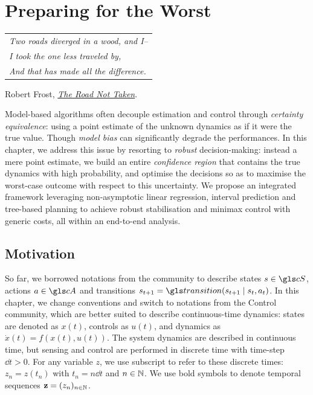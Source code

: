 
\graphicspath{{2-Chapters/7-Chapter/}}

\chapter{Preparing for the Worst}
\label{chapter:7}

\begin{flushright}
	\begin{tabular}{@{}l@{}}
		\emph{Two roads diverged in a wood, and I--}\\
		\emph{I took the one less traveled by,}\\
		\emph{And that has made all the difference.}\\
	\end{tabular}
	
	Robert Frost, \href{https://eleurent.github.io/sisyphe/texts/the-road-not-taken.html}{\emph{The Road Not Taken}}.
\end{flushright}

\abstractStartChapter{}%
Model-based algorithms often decouple estimation and control through \emph{certainty equivalence}: using a point estimate of the unknown dynamics as if it were the true value. Though \textit{model bias} can significantly degrade the performances. In this chapter, we address this issue by resorting to \emph{robust} decision-making: instead a mere point estimate, we build an entire \emph{confidence region} that contains the true dynamics with high probability, and optimise the decisions so as to maximise the worst-case outcome with respect to this uncertainty. We propose an integrated framework leveraging non-asymptotic linear regression, interval prediction and tree-based planning to achieve robust stabilisation and minimax control with generic costs, all within an end-to-end analysis.
\minitocStartChapter{}

\section{Motivation}

\begin{remark}
\begin{leftbar}[remarkbar]
So far, we borrowed notations from the  community to describe states $s\in \cS$, actions $a\in\cA$ and transitions $s_{t+1} = \Ps\parentheses{s_{t+1}\mid s_t,a_t}$. In this chapter, we change conventions and switch to notations from the Control community, which are better suited to describe continuous-time dynamics: states are denoted as $x(t)$, controls as $u(t)$, and dynamics as $\dot{x}(t) = f(x(t), u(t))$. 
The system dynamics are described in continuous time, but sensing and control are performed in discrete time with time-step $\dd t>0$. For any variable $z$, we use subscript to refer to these discrete times: $z_n = z(t_n)$ with $t_n = n\dd t$ and $n\in\mathbb{N}$. We use bold symbols to denote temporal sequences $\mathbf{z} = (z_n)_{n\in\mathbb{N}}$.
\end{leftbar}
\end{remark}

